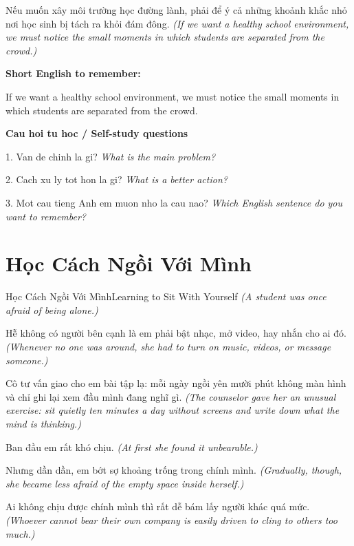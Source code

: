 \begin{baihoc}
Nếu muốn xây môi trường học đường lành, phải để ý cả những khoảnh khắc nhỏ nơi học sinh bị tách ra khỏi đám đông.
\textit{(If we want a healthy school environment, we must notice the small moments in which students are separated from the crowd.)}
\end{baihoc}

\begin{ghinhoanh}
\textbf{Short English to remember:}

If we want a healthy school environment, we must notice the small moments in which students are separated from the crowd.

\end{ghinhoanh}

\begin{tuhocnhanh}
\textbf{Cau hoi tu hoc / Self-study questions}

1. Van de chinh la gi? \textit{What is the main problem?}

2. Cach xu ly tot hon la gi? \textit{What is a better action?}

3. Mot cau tieng Anh em muon nho la cau nao? \textit{Which English sentence do you want to remember?}
\end{tuhocnhanh}
\ngancach

\section{Học Cách Ngồi Với Mình}
\begin{truyen}{Học Cách Ngồi Với Mình}{Learning to Sit With Yourself}
\textit{(A student was once afraid of being alone.)}

Hễ không có người bên cạnh là em phải bật nhạc, mở video, hay nhắn cho ai đó.
\textit{(Whenever no one was around, she had to turn on music, videos, or message someone.)}

Cô tư vấn giao cho em bài tập lạ: mỗi ngày ngồi yên mười phút không màn hình và chỉ ghi lại xem đầu mình đang nghĩ gì.
\textit{(The counselor gave her an unusual exercise: sit quietly ten minutes a day without screens and write down what the mind is thinking.)}

Ban đầu em rất khó chịu.
\textit{(At first she found it unbearable.)}

Nhưng dần dần, em bớt sợ khoảng trống trong chính mình.
\textit{(Gradually, though, she became less afraid of the empty space inside herself.)}

Ai không chịu được chính mình thì rất dễ bám lấy người khác quá mức.
\textit{(Whoever cannot bear their own company is easily driven to cling to others too much.)}

\end{truyen}

